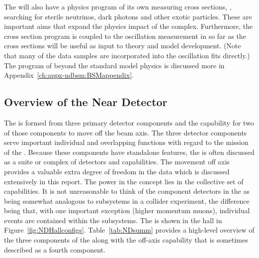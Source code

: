 The   will also have a physics program of its own measuring cross sections, , searching for sterile neutrinos, dark photons and other exotic particles. These are important aims that expand the physics impact of the  complex.  %
Furthermore, the cross section program is coupled to the oscillation measurement in so far as the cross sections will be useful as input to theory and model development.   (Note that many of the  data samples are incorporated into the oscillation fits directly.) The   program of beyond the standard model physics is discussed more in Appendix~\ref{ch:appx-ndbsm:BSMappendix}.


\subsection{Overview of the Near Detector}
\label{sec:appx-nd:BriefOverview}

The   is formed from three primary detector components and the capability for two of those components to move off the beam axis. The three detector components serve important individual and overlapping functions with regard to the mission of the .  Because these components have standalone features, the   is often discussed as a suite or complex of detectors and capabilities.  The movement off axis provides a valuable extra degree of freedom in the data which is discussed extensively in this report.  The power in the   concept lies in the collective set of capabilities.  It is not unreasonable to think of the component detectors in the   as being somewhat analogous to subsystems in a collider experiment, the difference being that, with one important exception (higher momentum muons), individual events are contained within the subsystems.  
The   is shown in the   hall in Figure~\ref{fig:NDHallconfigs}.  Table~\ref{tab:NDsumm} provides a high-level overview of the three components of the   along with the off-axis capability that is sometimes described as a fourth component.  

